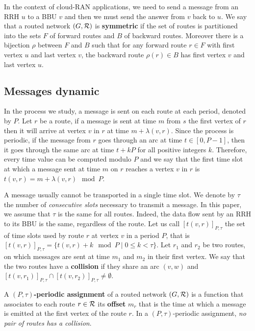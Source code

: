 \documentclass[10pt, conference, letterpaper]{IEEEtran}
\begin{document}
   In the context of cloud-RAN applications, we need to send a message from an RRH $u$ to a BBU $v$ and then 
      we must send the answer from $v$ back to $u$. We say that a routed network $(G, {\cal R})$ is \textbf{symmetric} if the set of routes is partitioned into the sets $F$ of forward routes and $B$ of backward routes. Moreover there is a bijection $\rho$ between $F$ and $B$ such that for any forward route $r \in F$ with first vertex $u$ and last vertex $v$, the backward route $\rho(r) \in B$ has first vertex $v$ and last vertex $u$. 
       

   \subsection{Messages dynamic}
      
      In the process we study, a message is sent on each route at each period, denoted by $P$.
      Let $r$ be a route, if a message is sent at time $m$ from $s$ the first vertex of $r$ then it will arrive at vertex $v$ in $r$ at time $m + \lambda(v,r)$. Since the process is periodic, if the message from $r$ goes through an arc at time $t\in [0,P-1]$, 
      then it goes through the same arc at time $t+kP$ for all positive integers $k$. Therefore, every time value can be computed modulo $P$ and we say that the first time slot at which a message sent at time $m$ on $r$ reaches a vertex $v$ in $r$ is $t(v,r) = m + \lambda(v,r)\mod P$. 
      
      A message usually cannot be transported in a single time slot. We denote by $\tau$ the number 
      of \emph{consecutive slots} necessary to transmit a message. In this paper, we assume that $\tau$ is the same for all routes. Indeed, the data flow sent by an RRH to its BBU is the same, regardless of the route. Let us call $[t(v,r)]_{P,\tau}$ the set of time slots used by route $r$ at vertex $v$ in a period $P$, that is $[t(v,r)]_{P,\tau} = \{t(v,r) + k \mod P \mid 0 \leq k < \tau \}$. 
      Let $r_1$ and $r_2$ be two routes, on which messages are sent at time $m_1$ and $m_2$ in their first vertex.
      We say that the two routes have a {\bf collision} if they share an arc $(v,w)$ and $[t(v,r_{1})]_{P,\tau} \cap [t(v,r_{2})]_{P,\tau} \neq \emptyset$.
      
         A {\bf $(P,\tau)$-periodic assignment} of a routed network $(G,\cal R)$ is a function that associates to each route 
         $r \in \cal R$ its \textbf{offset} $m_r$ that is the time at which a message is emitted at the first vertex of the route $r$.  In a $(P,\tau)$-periodic assignment, \emph{no pair of routes has a collision}.
                     
\end{document}

